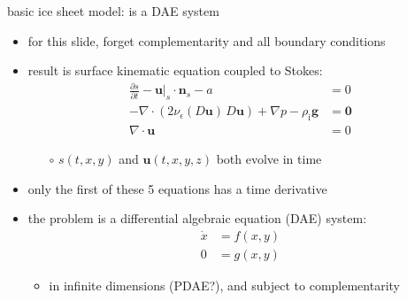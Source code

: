\documentclass[svgnames,
               hyperref={colorlinks,citecolor=DeepPink4,linkcolor=FireBrick,urlcolor=Maroon},
               usepdftitle=false]  %
               {beamer}
\newcommand{\eps}{\epsilon}
\newcommand{\bn}{\mathbf{n}}
\newcommand{\bu}{\mathbf{u}}
\newcommand{\bzero}{\bm{0}}
\newcommand{\rhoi}{\rho_{\text{i}}}
\begin{document}
\begin{frame}{basic ice sheet model: is a DAE system}

\begin{itemize}
\item for this slide, forget complementarity and all boundary conditions
\item result is surface kinematic equation coupled to Stokes:
\begin{align*}
\frac{\partial s}{\partial t} - \bu|_s \cdot \bn_s - a &= 0 \\
- \nabla \cdot \left(2 \nu_\eps(D\bu)\, D\bu\right) + \nabla p - \rhoi \mathbf{g} &= \bzero \\
\nabla \cdot \bu &= 0
\end{align*}

\vspace{-2mm}
    \begin{itemize}
    \item[$\circ$] $s(t,x,y)$ and $\bu(t,x,y,z)$ both evolve in time
    \end{itemize}
\item<2-> only the first of these 5 equations has a time derivative
\item<3> the problem is a \alert{differential algebraic equation} (DAE) system:
\begin{align*}
\dot x &= f(x,y) \\
     0 &= g(x,y)
\end{align*}

    \begin{itemize}
    \item<3>[$\circ$] in infinite dimensions (PDAE?), and subject to complementarity
    \end{itemize}
\end{itemize}
\end{frame}
\end{document}
